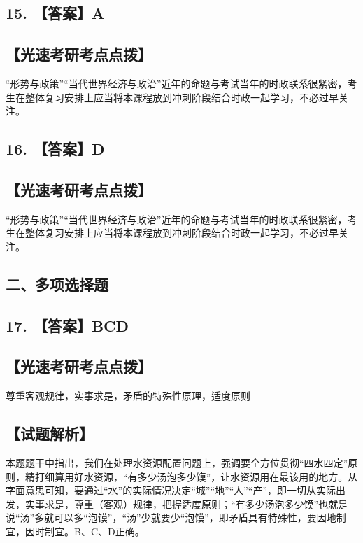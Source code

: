 \documentclass[UTF8,11pt]{ctexart}
\begin{document}
\subsection*{15. 【答案】A}

\subsection*{【光速考研考点点拨】}

“形势与政策”“当代世界经济与政治”近年的命题与考试当年的时政联系很紧密，考生在整体复习安排上应当将本课程放到冲刺阶段结合时政一起学习，不必过早关注。


\subsection*{16. 【答案】D}

\subsection*{【光速考研考点点拨】}

“形势与政策”“当代世界经济与政治”近年的命题与考试当年的时政联系很紧密，考生在整体复习安排上应当将本课程放到冲刺阶段结合时政一起学习，不必过早关注。


\subsection*{二、多项选择题}

\subsection*{17. 【答案】BCD}

\subsection*{【光速考研考点点拨】}

尊重客观规律，实事求是，矛盾的特殊性原理，适度原则


\subsection*{【试题解析】}

本题题干中指出，我们在处理水资源配置问题上，强调要全方位贯彻“四水四定”原则，精打细算用好水资源，“有多少汤泡多少馍”，让水资源用在最该用的地方。从字面意思可知，要通过“水”的实际情况决定“城”“地”“人”“产”，即一切从实际出发，实事求是，尊重（客观）规律，把握适度原则；“有多少汤泡多少馍”也就是说“汤”多就可以多“泡馍”，“汤”少就要少“泡馍”，即矛盾具有特殊性，要因地制宜，因时制宜。B、C、D正确。
\end{document}
